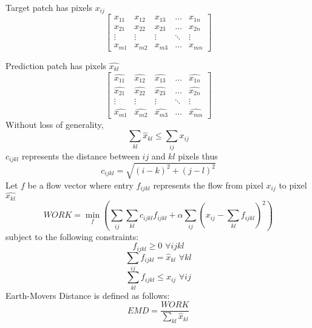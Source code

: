 \documentclass[twoside,11pt]{article}
\theoremstyle{definition}
\begin{document}
Target patch has pixels $x_{ij}$\\
\[
\begin{bmatrix}
    x_{11} & x_{12} & x_{13} & \dots  & x_{1n} \\
    x_{21} & x_{22} & x_{23} & \dots  & x_{2n} \\
    \vdots & \vdots & \vdots & \ddots & \vdots \\
    x_{m1} & x_{m2} & x_{m3} & \dots  & x_{mn}
\end{bmatrix}
\]

Prediction patch has pixels $\hat{x_{kl}}$\\
\[
\begin{bmatrix}
    \hat{x_{11}} & \hat{x_{12}} & \hat{x_{13}} & \dots  & \hat{x_{1n}} \\
    \hat{x_{21}} & \hat{x_{22}} & \hat{x_{23}} & \dots  & \hat{x_{2n}} \\
    \vdots & \vdots & \vdots & \ddots & \vdots \\
    \hat{x_{m1}} & \hat{x_{m2}} & \hat{x_{m3}} & \dots  & \hat{x_{mn}}
\end{bmatrix}
\]
Without loss of generality, 
\[
\sum_{kl}{\hat{x}_{kl}} \leq \sum_{ij}{x_{ij}}
\]
$c_{ijkl}$ represents the distance between $ij$ and $kl$ pixels thus
\[
c_{ijkl} = \sqrt{(i-k)^2 + (j-l)^2}
\]
Let $f$ be a flow vector where entry $f_{ijkl}$ represents the flow from pixel $x_{ij}$ to pixel $\hat{x_{kl}}$\\
\[
WORK = \min_f(\sum_{ij}{\sum_{kl}{c_{ijkl} f_{ijkl}}} + \alpha \sum_{ij}{(x_{ij} - \sum_{kl}{f_{ijkl}})^2})
\]
subject to the following constraints:\\
\[
f_{ijkl} \geq 0 \, \, \forall ijkl
\]
\[
\sum_{ij}{f_{ijkl}} = \hat{x}_{kl} \, \, \forall kl
\]
\[
\sum_{kl}{f_{ijkl}} \leq x_{ij} \, \, \forall ij
\]
Earth-Movers Distance is defined as follows:
\[
EMD = \frac{WORK}{\sum_{kl}{\hat{x}_{kl}}}
\]
\end{document}
